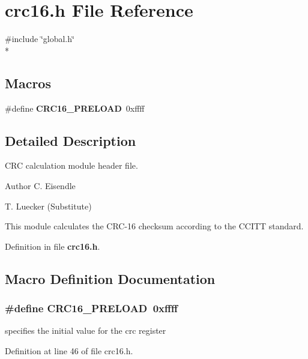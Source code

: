 \section{crc16.\-h File Reference}
\label{crc16_8h}
{\ttfamily \#include \char`\"{}global.\-h\char`\"{}}\\*
\subsection*{Macros}
\begin{DoxyCompactItemize}
\item 
\#define {\bf C\-R\-C16\-\_\-\-P\-R\-E\-L\-O\-A\-D}~0xffff
\end{DoxyCompactItemize}


\subsection{Detailed Description}
C\-R\-C calculation module header file. \begin{DoxyAuthor}{Author}
C. Eisendle 

T. Luecker (Substitute)
\end{DoxyAuthor}
This module calculates the C\-R\-C-\/16 checksum according to the C\-C\-I\-T\-T standard. 

Definition in file {\bf crc16.\-h}.



\subsection{Macro Definition Documentation}
\subsubsection[{C\-R\-C16\-\_\-\-P\-R\-E\-L\-O\-A\-D}]{\setlength{\rightskip}{0pt plus 5cm}\#define C\-R\-C16\-\_\-\-P\-R\-E\-L\-O\-A\-D~0xffff}\label{crc16_8h_a4f46507e33228099291a4e915282664c}
specifies the initial value for the crc register 

Definition at line 46 of file crc16.\-h.

